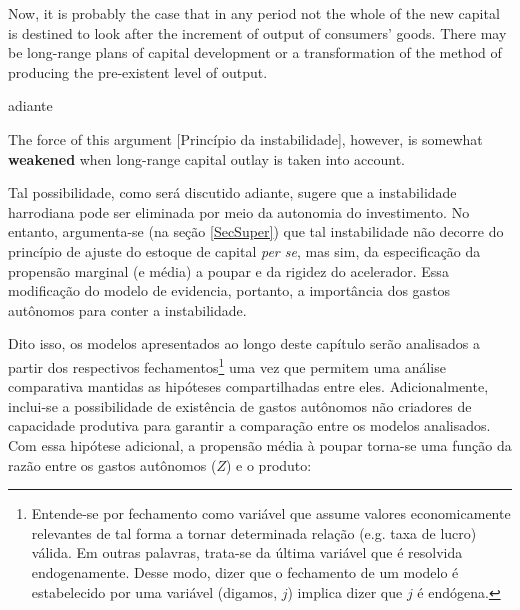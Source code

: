 \begin{citacao}
Now, it is probably the case that in any period not the whole of the new capital is destined to look after the increment of output of consumers' goods. There may be  long-range plans of capital development or a transformation  of the method of  producing  the pre-existent level of output. \cite[p.~17]{harrod_essay_1939}
\end{citacao}
adiante
\begin{citacao}
The force  of this  argument [Princípio da instabilidade], however, is somewhat \textbf{weakened} when long-range  capital outlay is taken into account.
\cite[p.~26, grifos adicionados]{harrod_essay_1939}
\end{citacao}
Tal possibilidade, como será discutido adiante, sugere que a instabilidade harrodiana pode ser eliminada por meio da autonomia do investimento.
No entanto, argumenta-se (na seção \ref{SecSuper}) que tal instabilidade não decorre do princípio de ajuste do estoque de capital \textit{per se}, mas sim, da especificação da propensão marginal (e média) a poupar e da rigidez do acelerador.
Essa modificação do modelo de \textcite{harrod_essay_1939} evidencia, portanto, a importância dos gastos autônomos para conter a instabilidade.

Dito isso, os modelos apresentados ao longo deste capítulo serão analisados a partir dos respectivos  fechamentos\footnote{Entende-se por fechamento como variável que assume valores economicamente relevantes de tal forma a tornar determinada relação (e.g. taxa de lucro) válida. Em outras palavras, trata-se da última variável que é resolvida endogenamente. Desse modo, dizer que o fechamento de um modelo é estabelecido por uma variável (digamos, $j$) implica dizer que $j$ é endógena.} uma vez que permitem uma análise comparativa mantidas as hipóteses compartilhadas entre eles. 
Adicionalmente, inclui-se a possibilidade de existência de gastos autônomos não criadores de capacidade produtiva para garantir a comparação entre os modelos analisados. Com essa hipótese adicional, a propensão média à poupar torna-se uma função da razão entre os gastos autônomos ($Z$) e o produto:

